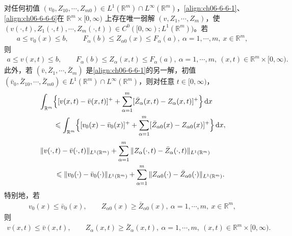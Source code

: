 \documentclass[../../main.tex]{subfiles}
\begin{document}
\begin{theorem}\label{theorem:ch06-6-6-1}
对任何初值 $(v_{0},Z_{10},\cdots,Z_{m0})\in L^{1}(\mathbb{R}^{m})\cap L^{\infty}(\mathbb{R}^{m})$，\eqref{align:ch06-6-6-1}、\eqref{align:ch06-6-6-6}在 $\mathbb{R}^{m}\times[0,\infty)$ 上存在唯一弱解 $(v,Z_{1},\cdots,Z_{m})$，使 $(v(\cdot,t),Z_{1}(\cdot,t),\cdots,Z_{m}(\cdot,t))\in C^{0}([0,\infty);L^{1}(\mathbb{R}^{m}))$。若
\begin{align}
a\leqslant v_{0}(x)\leqslant b,\qquad F_{\alpha}(b)\leqslant Z_{\alpha 0}(x)\leqslant F_{\alpha}(a),\ \alpha=1,\cdots,m,\ x\in\mathbb{R}^{m},
\label{align:ch06-6-6-8}
\end{align}
则
\begin{align}
a\leqslant v(x,t)\leqslant b,\qquad F_{\alpha}(b)\leqslant Z_{\alpha}(x,t)\leqslant F_{\alpha}(a),\ \alpha=1,\cdots,m,\ (x,t)\in\mathbb{R}^{m}\times[0,\infty).
\label{align:ch06-6-6-9}
\end{align}
此外，若 $(\bar{v},\bar{Z}_{1},\cdots,\bar{Z}_{m})$ 是\eqref{align:ch06-6-6-1}的另一解，初值 $(\bar{v}_{0},\bar{Z}_{10},\cdots,\bar{Z}_{m0})\in L^{1}(\mathbb{R}^{m})\cap L^{\infty}(\mathbb{R}^{m})$，则对任意 $t\in[0,\infty)$，
\begin{align}
&\int_{\mathbb{R}^{m}}\Bigl{\{}[v(x,t)-\bar{v}(x,t)]^{+}+\sum_{\alpha=1}^{m}[\bar{Z}_{\alpha}(x,t)-Z_{\alpha}(x,t)]^{+}\Bigr{\}}\,\mathrm{d}x\notag\\
&\qquad\leqslant\int_{\mathbb{R}^{m}}\Bigl{\{}[v_{0}(x)-\bar{v}_{0}(x)]^{+}+\sum_{\alpha=1}^{m}[\bar{Z}_{\alpha 0}(x)-Z_{\alpha 0}(x)]^{+}\Bigr{\}}\,\mathrm{d}x,
\label{align:ch06-6-6-10}
\end{align}
\begin{align}
&\|v(\cdot,t)-\bar{v}(\cdot,t)\|_{L^{1}(\mathbb{R}^{m})}+\sum_{\alpha=1}^{m}\|Z_{\alpha}(\cdot,t)-\bar{Z}_{\alpha}(\cdot,t)\|_{L^{1}(\mathbb{R}^{m})}\notag\\
&\qquad\leqslant\|v_{0}(\cdot)-\bar{v}_{0}(\cdot)\|_{L^{1}(\mathbb{R}^{m})}+\sum_{\alpha=1}^{m}\|Z_{\alpha 0}(\cdot)-\bar{Z}_{\alpha 0}(\cdot)\|_{L^{1}(\mathbb{R}^{m})}.
\label{align:ch06-6-6-11}
\end{align}
特别地，若
\begin{align}
v_{0}(x)\leqslant\bar{v}_{0}(x),\qquad Z_{\alpha 0}(x)\geqslant\bar{Z}_{\alpha 0}(x),\ \alpha=1,\cdots,m,\ x\in\mathbb{R}^{m},
\label{align:ch06-6-6-12}
\end{align}
则
\begin{align}
v(x,t)\leqslant\bar{v}(x,t),\qquad Z_{\alpha}(x,t)\geqslant\bar{Z}_{\alpha}(x,t),\ \alpha=1,\cdots,m,\ (x,t)\in\mathbb{R}^{m}\times[0,\infty).
\label{align:ch06-6-6-13}
\end{align}
\end{theorem}
\end{document}
